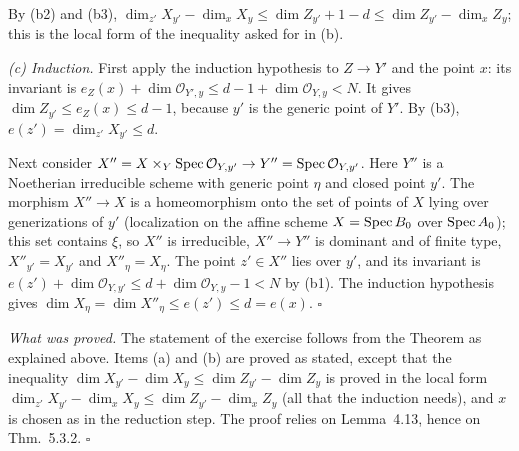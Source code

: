 \documentclass[11pt]{article}
\begin{document}
By (b2) and (b3), $\dim_{z'}X_{y'}-\dim_xX_y\le\dim Z_{y'}+1-d\le\dim Z_{y'}-\dim_xZ_y$; this is the local form of the inequality asked for in (b).

\emph{(c) Induction.} First apply the induction hypothesis to $Z\to Y'$ and the point $x$: its invariant is $e_Z(x)+\dim\mathcal O_{Y',y}\le d-1+\dim\mathcal O_{Y,y}<N$. It gives $\dim Z_{y'}\le e_Z(x)\le d-1$, because $y'$ is the generic point of $Y'$. By (b3), $e(z')=\dim_{z'}X_{y'}\le d$.

Next consider $X''=X\times_Y\operatorname{Spec}\mathcal O_{Y,y'}\to Y''=\operatorname{Spec}\mathcal O_{Y,y'}$. Here $Y''$ is a Noetherian irreducible scheme with generic point $\eta$ and closed point $y'$. The morphism $X''\to X$ is a homeomorphism onto the set of points of $X$ lying over generizations of $y'$ (localization on the affine scheme $X=\operatorname{Spec} B_0$ over $\operatorname{Spec} A_0$); this set contains $\xi$, so $X''$ is irreducible, $X''\to Y''$ is dominant and of finite type, $X''_{y'}=X_{y'}$ and $X''_\eta=X_\eta$. The point $z'\in X''$ lies over $y'$, and its invariant is $e(z')+\dim\mathcal O_{Y,y'}\le d+\dim\mathcal O_{Y,y}-1<N$ by (b1). The induction hypothesis gives $\dim X_\eta=\dim X''_\eta\le e(z')\le d=e(x)$. \hfill$\square$

\emph{What was proved.} The statement of the exercise follows from the Theorem as explained above. Items (a) and (b) are proved as stated, except that the inequality $\dim X_{y'}-\dim X_y\le\dim Z_{y'}-\dim Z_y$ is proved in the local form $\dim_{z'}X_{y'}-\dim_xX_y\le\dim Z_{y'}-\dim_xZ_y$ (all that the induction needs), and $x$ is chosen as in the reduction step. The proof relies on Lemma~4.13, hence on Thm.~5.3.2. \hfill$\square$
\end{document}

